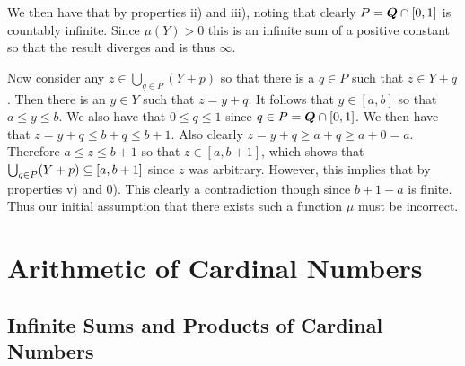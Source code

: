 \begin{questions}
{{  We then have that
  by properties ii) and iii), noting that clearly $P = \rats \cap [0,1]$ is countably infinite.
  Since $\mu(Y) > 0$ this is an infinite sum of a positive constant so that the result diverges and is thus $\infty$.

  Now consider any $z \in \bigcup_{q \in P} (Y + p)$ so that there is a $q \in P$ such that $z \in Y + q$.
  Then there is an $y \in Y$ such that $z = y + q$.
  It follows that $y \in [a, b]$ so that $a \leq y \leq b$.
  We also have that $0 \leq q \leq 1$ since $q \in P = \rats \cap [0,1]$.
  We then have that $z = y + q \leq b + q \leq b + 1$.
  Also clearly $z = y + q \geq a + q \geq a + 0 = a$.
  Therefore $a \leq z \leq b+1$ so that $z \in [a, b+1]$, which shows that $\bigcup_{q \in P} (Y + p) \ss [a, b+1]$ since $z$ was arbitrary.
  However, this implies that
  by properties v) and 0).
  This clearly a contradiction though since $b+1-a$ is finite.
  Thus our initial assumption that there exists such a function $\mu$ must be incorrect.
  }
  }

  \section{Arithmetic of Cardinal Numbers}
  \subsection{Infinite Sums and Products of Cardinal Numbers}

\end{questions}
